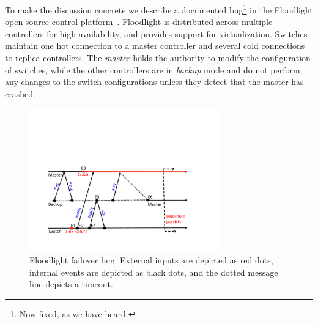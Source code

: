 %
%

To make the discussion concrete we describe a
documented bug\footnote{Now fixed, as we have heard.} in the Floodlight
open source control platform~\cite{floodlight_bug}. Floodlight is distributed across
multiple controllers for high availability, and provides support for
virtualization. Switches maintain one hot connection to a master controller and
several cold connections to replica controllers. The \emph{master} holds the
authority to modify the configuration of switches, while the other
controllers are in \emph{backup} mode and do not perform any changes to the
switch configurations unless they detect that the master has crashed.

\begin{figure}[t]
  \includegraphics[width=3.25in]{../diagrams/case_study/example_bug.pdf}
  \caption[]{\label{fig:example} Floodlight failover bug. External inputs
             are depicted as red dots, internal events are depicted as black
             dots, and the dotted message line depicts a timeout.}
\end{figure}

